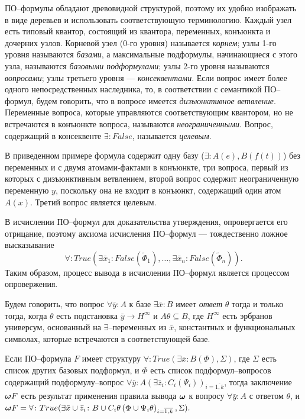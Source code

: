 \documentclass[a4paper]{report}
\begin{document}
ПО--формулы обладают древовидной структурой, поэтому их удобно изображать в виде деревьев и использовать соответствующую терминологию. Каждый узел есть типовый квантор, состоящий из квантора, переменных, конъюнкта и дочерних узлов. Корневой узел (0-го уровня) называется \emph{корнем}; узлы 1-го уровня называются \emph{базами}, а максимальные подформулы, начинающиеся с этого узла, называются \emph{базовыми подформулами}; узлы 2-го уровня называются \emph{вопросами}; узлы третьего уровня --- \emph{консеквентами}. Если вопрос имеет более одного непосредственных наследника, то, в соответствии с семантикой ПО--формул, будем говорить, что в вопросе имеется \emph{дизъюнктивное ветвление}. Переменные вопроса, которые управляются соответствующим квантором, но не встречаются в конъюнкте вопроса, называются \emph{неограниченными}. Вопрос, содержащий в консеквенте $\exists\colon False$, называется \emph{целевым}.

В приведенном примере формула содержит одну базу ($\exists\colon A(e),B(f(t))$) без переменных и с двумя атомами-фактами в конъюнкте, три вопроса, первый из которых с дизъюнктивным ветвлением, второй вопрос содержит не\-о\-гра\-ни\-чен\-ную переменную $y$, поскольку она не входит в конъюнкт, содержащий один атом $A(x)$. Третий вопрос является целевым. %

В исчислении ПО--формул для доказательства утверждения, опровергается его отрицание, поэтому аксиома исчисления ПО--формул ---  тождественно ложное высказывание $$\forall\colon True\left(\exists \bar{x}_1\colon False\left(\widetilde{\Phi}_1\right),\ldots,\exists \bar{x}_n\colon False\left(\widetilde{\Phi}_n\right)\right).$$ Таким образом, процесс вывода в исчислении ПО--формул является процессом опровержения.

Будем говорить, что вопрос $\forall \bar{y}\colon A$ к базе $\exists \bar{x}\colon B$ имеет {\em ответ} $\theta$  тогда и только тогда, когда $\theta$ есть подстановка $\bar{y} \rightarrow H^{\infty}$ и $A\theta \subseteq B$, где $H^{\infty}$ есть эрбранов универсум, основанный на $\exists$--переменных из $\bar{x}$, константных и функциональных символах, которые встречаются в соответствующей базе.

Если ПО--формула $F$ имеет структуру $\forall\colon True\left(\exists \bar{x}\colon B\left(\Phi\right),\Sigma\right)$, где $\Sigma$ есть список других базовых подформул, и $\Phi$ есть список подформул--вопросов содержащий подформулу--вопрос $\forall \bar{y}\colon A(\exists \bar{z}_i\colon C_i\left(\Psi_i\right))_{i=\overline{1,k}}$, тогда заключение $\boldsymbol{\omega} F$ есть результат применения правила вывода $\boldsymbol{\omega}$ к вопросу $\forall \bar{y}\colon A$ с ответом $\theta$, и $\boldsymbol{\omega} F = \forall\colon True(\exists \bar{x} \cup \bar{z}_i\colon B \cup C_i\theta\left(\Phi \cup \Psi_i\theta\right)_{i=\overline{1,k}},\Sigma).$
\end{document}
